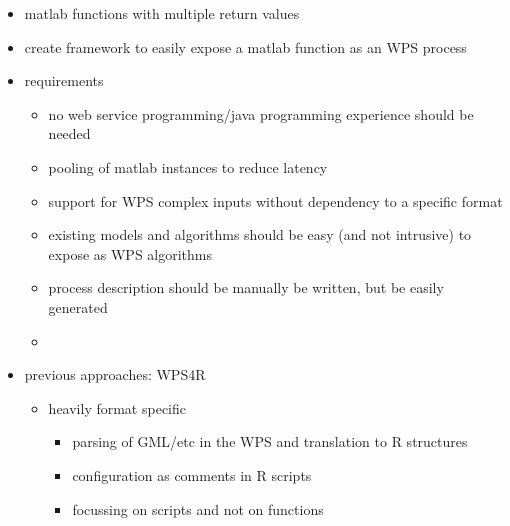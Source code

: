 \begin{itemize}
		\item matlab functions with multiple return values
		\item create framework to easily expose a matlab function as an WPS process
		\item requirements
		\begin{itemize}
			\item no web service programming/java programming experience should be needed
			\item pooling of matlab instances to reduce latency
			\item support for WPS complex inputs without dependency to a specific format
			\item existing models and algorithms should be easy (and not intrusive) to expose as WPS algorithms
			\item process description should be manually be written, but be easily generated
			\item
		\end{itemize}
		\item previous approaches: WPS4R
		\begin{itemize}
			\item heavily format specific
			\begin{itemize}
				\item parsing of GML/etc in the WPS and translation to R structures
				\item configuration as comments in R scripts
				\item focussing on scripts and not on functions
			\end{itemize}
		\end{itemize}
	\end{itemize}
